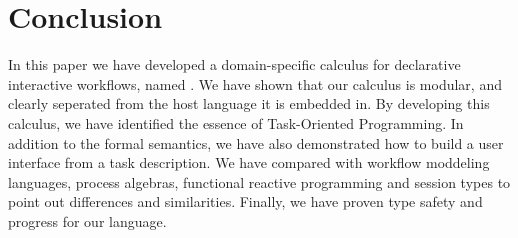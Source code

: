 
\section{Conclusion}

\label{sec:conclusions}

In this paper we have developed a domain-specific calculus for declarative interactive workflows, named \TOPHAT.
We have shown that our calculus is modular, and clearly seperated from the host language it is embedded in.
By developing this calculus, we have identified the essence of Task-Oriented Programming.
In addition to the formal semantics, we have also demonstrated how to build a user interface from a task description.
We have compared \TOPHAT with workflow moddeling languages, process algebras, functional reactive programming and session types to point out differences and similarities.
Finally, we have proven type safety and progress for our language.
